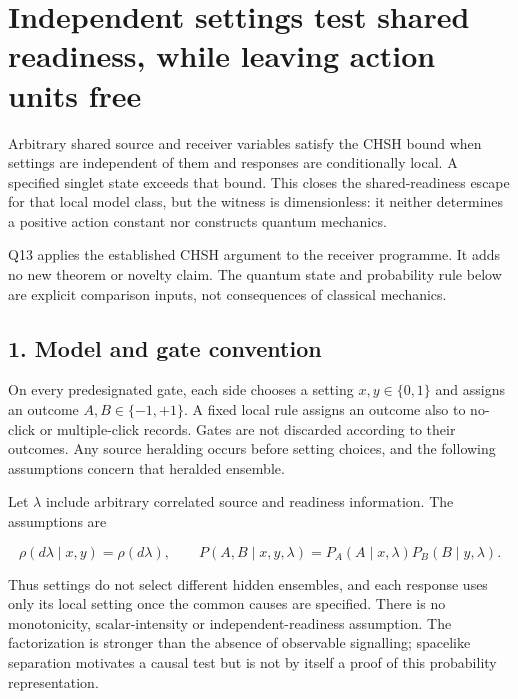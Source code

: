 \documentclass[11pt,a4paper]{article}
\begin{document}
\hypertarget{independent-settings-test-shared-readiness-while-leaving-action-units-free}{%
\section{Independent settings test shared readiness, while leaving
action units
free}\label{independent-settings-test-shared-readiness-while-leaving-action-units-free}}

Arbitrary shared source and receiver variables satisfy the CHSH bound
when settings are independent of them and responses are conditionally
local. A specified singlet state exceeds that bound. This closes the
shared-readiness escape for that local model class, but the witness is
dimensionless: it neither determines a positive action constant nor
constructs quantum mechanics.

Q13 applies the established CHSH argument to the receiver programme. It
adds no new theorem or novelty claim. The quantum state and probability
rule below are explicit comparison inputs, not consequences of classical
mechanics.

\hypertarget{model-and-gate-convention}{%
\subsection{1. Model and gate
convention}\label{model-and-gate-convention}}

On every predesignated gate, each side chooses a setting
\(x,y\in\{0,1\}\) and assigns an outcome \(A,B\in\{-1,+1\}\). A fixed
local rule assigns an outcome also to no-click or multiple-click
records. Gates are not discarded according to their outcomes. Any source
heralding occurs before setting choices, and the following assumptions
concern that heralded ensemble.

Let \(\lambda\) include arbitrary correlated source and readiness
information. The assumptions are

\[\rho(d\lambda\mid x,y)=\rho(d\lambda),\qquad
P(A,B\mid x,y,\lambda)=P_A(A\mid x,\lambda)P_B(B\mid y,\lambda). \tag{1}\]

Thus settings do not select different hidden ensembles, and each
response uses only its local setting once the common causes are
specified. There is no monotonicity, scalar-intensity or
independent-readiness assumption. The factorization is stronger than the
absence of observable signalling; spacelike separation motivates a
causal test but is not by itself a proof of this probability
representation.
\end{document}

